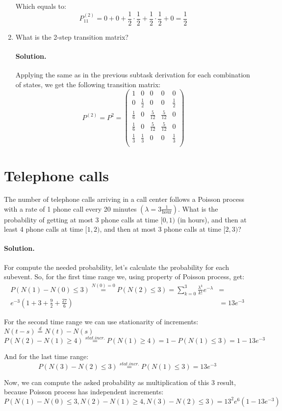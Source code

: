 \documentclass[a4paper, 12pt]{article}
\newcommand{\rbra}[1]{\left( #1 \right)}
\newcommand{\sol}[1]{\paragraph{Solution.} #1}
\newcommand{\task}[2]{
    \item #1 \sol{#2}
}
\begin{document}
\begin{enumerate}
{        Which equals to:
        \[
            P^{(2)}_{11} = 0 + 0 + \frac{1}{2} \cdot \frac{1}{2} + \frac{1}{2} \cdot \frac{1}{2} + 0 = \frac{1}{2}
        \]
    }
    \task{What is the 2-step transition matrix?}
    {
        Applying the same as in the previous subtask derivation for each combination of states,
        we get the following transition matrix:
        \[
            P^{(2)} = P^2 = \begin{pmatrix}
                1           & 0           & 0            & 0            & 0           \\
                0           & \frac{1}{2} & 0            & 0            & \frac{1}{2} \\
                \frac{1}{6} & 0           & \frac{5}{12} & \frac{5}{12} & 0           \\
                \frac{1}{6} & 0           & \frac{5}{12} & \frac{5}{12} & 0           \\
                \frac{1}{3} & \frac{1}{3} & 0            & 0            & \frac{1}{3} \\
            \end{pmatrix}
        \]
    }
\end{enumerate}

\section{Telephone calls}
The number of telephone calls arriving in a call center follows a Poisson process with a rate
of 1 phone call every 20 minutes $\rbra{\lambda = 3 \frac{1}{\text{hour}}}$.
What is the probability of getting at most
3 phone calls at time $[0, 1)$ (in hours), and then at least 4 phone calls at time $[1, 2)$, and
then at most 3 phone calls at time $[2, 3)$?

\sol{
    For compute the needed probability, let's calculate the probability
    for each subevent. So, for the first time range we,
    using property of Poisson process, get:
    \begin{align*}
        P(N(1) - N(0) \leq 3) \stackrel{N(0) = 0}{=}
        P(N(2) \leq 3) =
        \sum\limits_{k=0}^{3} \frac{\lambda^k}{k!} e^{-\lambda} & =           \\
        e^{-3} \rbra{ 1 + 3 + \frac{9}{2} + \frac{27}{6} }      & = 13 e^{-3}
    \end{align*}

    For the second time range we can use stationarity of
    increments: $N(t - s) \stackrel{d}{=} N(t) - N(s)$
    \[
        P(N(2) - N(1) \geq 4) \stackrel{stat. incr.}{=}
        P(N(1) \geq 4) = 1 - P(N(1) \leq 3) = 1 - 13 e^{-3}
    \]

    And for the last time range:
    \[
        P(N(3) - N(2) \leq 3) \stackrel{stat. incr.}{=}
        P(N(1) \leq 3) = 13 e^{-3}
    \]

    Now, we can compute the asked probability as multiplication of
    this 3 result, because Poisson process has independent increments:
    \[
        P(N(1) - N(0) \leq 3, N(2) - N(1) \geq 4, N(3) - N(2) \leq 3) =
        13^2 e^{6} (1 - 13 e^{-3})
    \]
}
\end{document}
